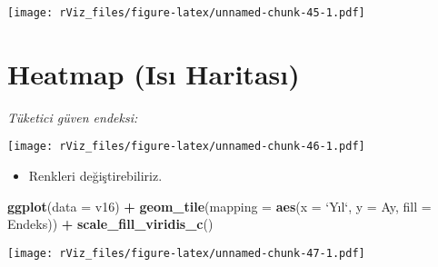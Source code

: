 \documentclass[
]{book}
\newenvironment{Shaded}{\begin{snugshade}}{\end{snugshade}}
\newcommand{\CommentTok}[1]{\textcolor[rgb]{0.56,0.35,0.01}{\textit{#1}}}
\newcommand{\DataTypeTok}[1]{\textcolor[rgb]{0.13,0.29,0.53}{#1}}
\newcommand{\KeywordTok}[1]{\textcolor[rgb]{0.13,0.29,0.53}{\textbf{#1}}}
\newcommand{\NormalTok}[1]{#1}
\newcommand{\OperatorTok}[1]{\textcolor[rgb]{0.81,0.36,0.00}{\textbf{#1}}}
\newcommand{\OtherTok}[1]{\textcolor[rgb]{0.56,0.35,0.01}{#1}}
\newcommand{\StringTok}[1]{\textcolor[rgb]{0.31,0.60,0.02}{#1}}
\providecommand{\tightlist}{%
  \setlength{\itemsep}{0pt}\setlength{\parskip}{0pt}}
\begin{document}
\texttt{[image: rViz\_files/figure-latex/unnamed-chunk-45-1.pdf]}

\hypertarget{heatmap-isux131-haritasux131}{%
\section{Heatmap (Isı Haritası)}\label{heatmap-isux131-haritasux131}}

\emph{Tüketici güven endeksi:}

\begin{Shaded}
\end{Shaded}

\texttt{[image: rViz\_files/figure-latex/unnamed-chunk-46-1.pdf]}

\begin{itemize}
\tightlist
\item
  Renkleri değiştirebiliriz.
\end{itemize}

\begin{Shaded}
\begin{Highlighting}[]
\KeywordTok{ggplot}\NormalTok{(}\DataTypeTok{data =}\NormalTok{ v16) }\OperatorTok{+}
\StringTok{  }\KeywordTok{geom_tile}\NormalTok{(}\DataTypeTok{mapping =} \KeywordTok{aes}\NormalTok{(}\DataTypeTok{x =} \StringTok{`}\DataTypeTok{Yıl}\StringTok{`}\NormalTok{, }\DataTypeTok{y =}\NormalTok{ Ay, }\DataTypeTok{fill =}\NormalTok{ Endeks)) }\OperatorTok{+}
\StringTok{  }\KeywordTok{scale_fill_viridis_c}\NormalTok{()}
\end{Highlighting}
\end{Shaded}

\texttt{[image: rViz\_files/figure-latex/unnamed-chunk-47-1.pdf]}
\end{document}
